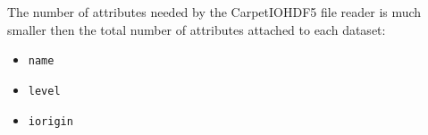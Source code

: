 The number of attributes needed by the CarpetIOHDF5 file reader is much smaller then the total
number of attributes attached to each dataset:

\begin{itemize}
  \item {\tt name}
  \item {\tt level}
  \item {\tt iorigin}
\end{itemize}


%
%
%
%
%
%
%
%
%



